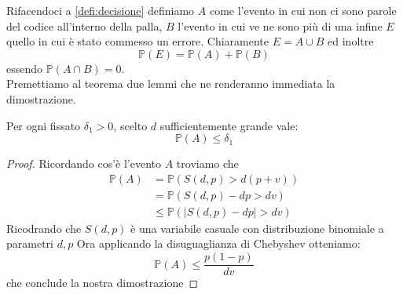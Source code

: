 Rifacendoci a \ref{defi:decisione} definiamo $A$ come l'evento in cui non ci sono parole del codice all'interno della palla, $B$ l'evento in cui ve ne sono più di una infine $E$ quello in cui è stato commesso un errore. Chiaramente $E=A\cup B$ ed inoltre 
\begin{equation}\label{eq:7.7}
\mathbb{P}(E)=\mathbb{P}(A)+ \mathbb{P}(B)
\end{equation}
essendo $\mathbb{P}(A \cap B)=0$.\\
Premettiamo al teorema due lemmi che ne renderanno immediata la dimostrazione.

\begin{lem}
Per ogni fissato $\delta_1>0$, scelto $d$ sufficientemente grande vale:
$$\mathbb{P}(A)\leq \delta_1$$   
\end{lem}
\begin{proof}
Ricordando cos'è l'evento $A$ troviamo che 	
 \[
\begin{split}
\mathbb{P}(A)&=\mathbb{P}(S(d,p)>d(p+v))\\
& = \mathbb{P}(S(d,p)-dp>dv)\\
& \leq \mathbb{P}(|S(d,p)-dp|>dv)
\end{split}
\]
Ricodrando che $S(d,p)$ è una variabile casuale con distribuzione binomiale a parametri $d,p$
Ora applicando la disuguaglianza di Chebyshev otteniamo:
$$\mathbb{P}(A)\leq \frac{p(1-p)}{dv}$$
che conclude la nostra dimostrazione
\end{proof}

